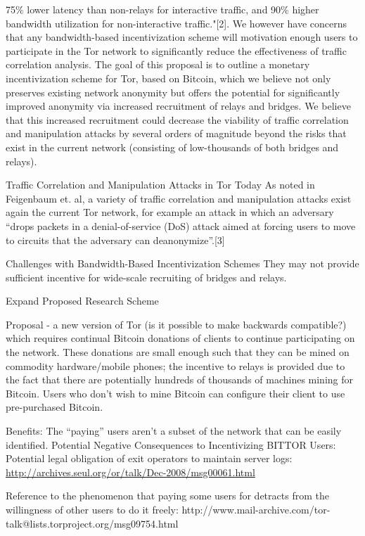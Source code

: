 \documentclass[letterpaper]{article}
\begin{document}
75\% lower latency than non-relays for interactive traffic, and 90\%
higher bandwidth utilization for non-interactive traffic."[2]. We
however have concerns that any bandwidth-based incentivization scheme
will motivation enough users to participate in the Tor network to
significantly reduce the effectiveness of traffic correlation
analysis. The goal of this proposal is to outline a monetary
incentivization scheme for Tor, based on Bitcoin, which we believe not
only preserves existing network anonymity but offers the potential for
significantly improved anonymity via increased recruitment of relays
and bridges. We believe that this increased recruitment could decrease
the  viability of traffic correlation and manipulation attacks by
several orders of magnitude beyond the risks that exist in the current
network (consisting of low-thousands of both bridges and relays).


Traffic Correlation and Manipulation Attacks in Tor Today
As noted in Feigenbaum et. al, a variety of traffic correlation and
manipulation attacks exist again the current Tor network, for example
an attack in which an adversary “drops packets in a denial-of-service
(DoS) attack aimed at forcing users to move to circuits that the
adversary can deanonymize”.[3]

Challenges with Bandwidth-Based Incentivization Schemes
They may not provide sufficient incentive for wide-scale recruiting of
bridges and relays.

Expand Proposed Research Scheme

Proposal - a new version of Tor (is it possible to make backwards
compatible?) which requires continual Bitcoin donations of clients to
continue participating on the network. These donations are small
enough such that they can be mined on commodity hardware/mobile
phones; the incentive to relays is provided due to the fact that there
are potentially hundreds of thousands of machines mining for
Bitcoin. Users who don’t wish to mine Bitcoin can configure their
client to use pre-purchased Bitcoin.

Benefits:
The “paying” users aren’t a subset of the network that can be easily identified.
Potential Negative Consequences to Incentivizing BITTOR Users:
Potential legal obligation of exit operators to maintain server logs:
\url{http://archives.seul.org/or/talk/Dec-2008/msg00061.html}


Reference to the phenomenon that paying some users for detracts from
the willingness of other users to do it freely:
http://www.mail-archive.com/tor-talk@lists.torproject.org/msg09754.html
\end{document}
